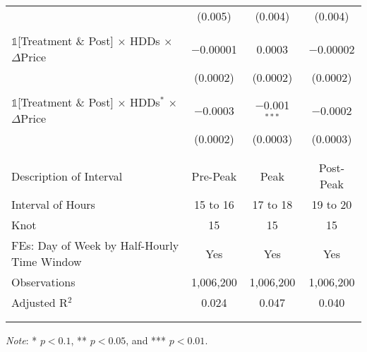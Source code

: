 {\begin{table}[t!]
\begin{adjustbox}{scale = 1.0}
\begin{threeparttable}
\begin{tabular}{@{\extracolsep{95pt}}lccc}
                    & (0.005) & (0.004) & (0.004) \\
                    & & & \\
                    $\mathbb{1}$[Treatment \& Post] $\times$ HDDs $\times$ $\Delta$Price & $-$0.00001 & 0.0003 & $-$0.00002 \\
                    & (0.0002) & (0.0002) & (0.0002) \\
                    & & & \\
                    $\mathbb{1}$[Treatment \& Post] $\times$ HDDs$^{*}$ $\times$ $\Delta$Price & $-$0.0003 & $-$0.001$^{***}$ & $-$0.0002 \\
                    & (0.0002) & (0.0003) & (0.0003) \\
                    & & & \\
                    \hline
                    \\[-2.0ex]
                    Description of Interval & Pre-Peak & Peak & Post-Peak \\
                    Interval of Hours & 15 to 16 & 17 to 18 & 19 to 20 \\
                    Knot & 15 & 15 & 15 \\
                    FEs: Day of Week by Half-Hourly Time Window & Yes & Yes & Yes \\
                    Observations & 1,006,200 & 1,006,200 & 1,006,200 \\
                    Adjusted R$^{2}$ & 0.024 & 0.047 & 0.040 \\
                    \\[-2.0ex]
                    \hline \hline
                    \\[-4.5ex]
                \end{tabular}
                \begin{tablenotes}[flushleft]
                    \footnotesize
                    \item \textit{Note}: * $p < 0.1$, ** $p < 0.05$, and *** $p < 0.01$.
                \end{tablenotes}
            \end{threeparttable}
        \end{adjustbox}
    \end{table}
}

